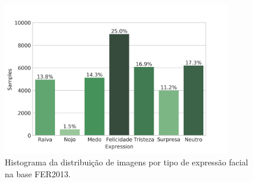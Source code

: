 \begin{figure}[!htb]
    \centering
    \caption{Histograma da distribuição de imagens por tipo de expressão facial na base FER2013.}  \label{fig:dataset}
    \includegraphics[width=10cm]{images/expression_distribution.png}
\end{figure}
